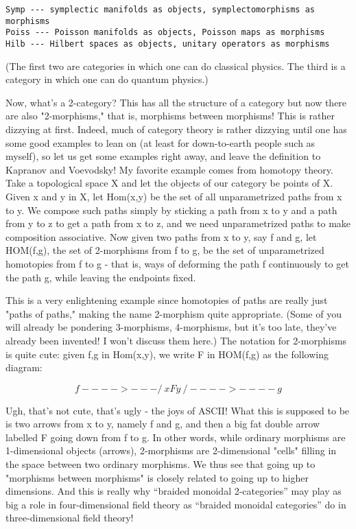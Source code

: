 \begin{verbatim}
Symp --- symplectic manifolds as objects, symplectomorphisms as morphisms
Poiss --- Poisson manifolds as objects, Poisson maps as morphisms
Hilb --- Hilbert spaces as objects, unitary operators as morphisms
\end{verbatim}
    

(The first two are categories in which one can do classical physics.
The third is a category in which one can do quantum physics.)

Now, what's a 2-category?  This has all the structure of a category but
now there are also "2-morphisms," that is, morphisms between morphisms!
This is rather dizzying at first.  Indeed, much of category theory is
rather dizzying until one has some good examples to lean on (at least
for down-to-earth people such as myself), so let us get some examples
right away, and leave the definition to Kapranov and Voevodsky!   My
favorite example comes from homotopy theory.  Take a topological space X
and let the objects of our category be points of X.  Given x and y in X,
let Hom(x,y) be the set of all unparametrized paths from x to y.  We
compose such paths simply by sticking a path from x to y and a path from
y to z to get a path from x to z, and we need unparametrized paths to
make composition associative. Now given two paths from x to y, say f and
g, let HOM(f,g), the set of  2-morphisms from f to g, be the set of
unparametrized homotopies from f to g - that is, ways of deforming the
path f continuously to get the path g, while leaving the endpoints fixed.  

This is a very enlightening example since homotopies of paths are really
just "paths of paths," making the name 2-morphism quite appropriate.
(Some of you will already be pondering 3-morphisms, 4-morphisms, but it's
too late, they've already been invented!  I won't discuss them here.)
The notation for 2-morphisms is quite cute: given f,g in Hom(x,y), we
write F in HOM(f,g) as the following diagram:

$$
                      f
                  ---->---
                 /         \
                x     F     y
                 \         /
                  ---->----
                      g
$$
    

Ugh, that's not cute, that's ugly - the joys of ASCII!  What this is
supposed to be is two arrows from x to y, namely f and g, and then
a big fat double arrow labelled F going down from f to g.  In other
words, while ordinary morphisms are 1-dimensional objects (arrows),
2-morphisms are 2-dimensional "cells" filling in the space between two 
ordinary morphisms.  We thus see that going up to "morphisms between
morphisms" is closely related to going up to higher dimensions.  And
this is really why ``braided monoidal 2-categories'' may play as big a
role in four-dimensional field theory as ``braided monoidal categories''
do in three-dimensional field theory!

